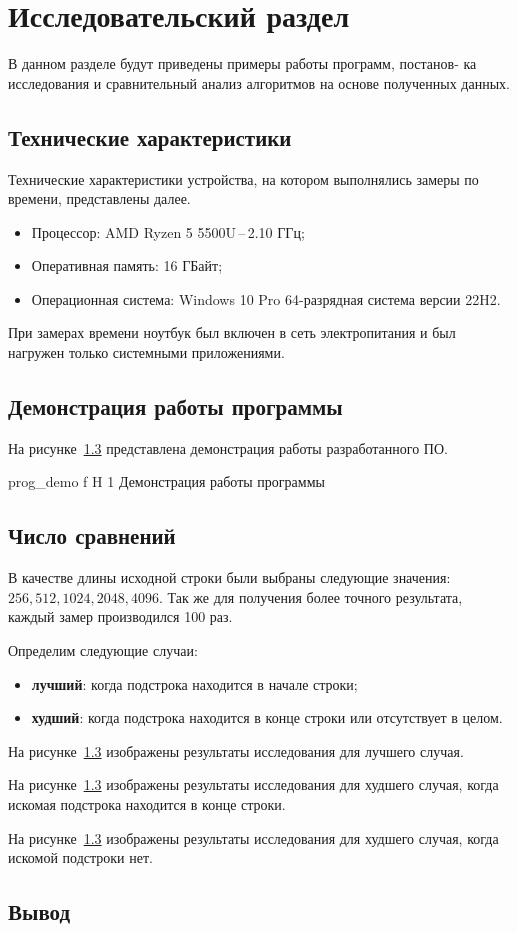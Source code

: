 \chapter{Исследовательский раздел}
В данном разделе будут приведены примеры работы программ, постанов-
ка исследования и сравнительный анализ алгоритмов на основе полученных
данных.

\section{Технические характеристики}
Технические характеристики устройства, на котором выполнялись замеры по времени, представлены далее.
\begin{itemize}
	\item Процессор: AMD Ryzen 5 5500U\,--\,2.10 ГГц;
	\item Оперативная память: 16 ГБайт;
	\item Операционная система: Windows 10 Pro 64-разрядная система версии 22H2.
\end{itemize}

При замерах времени ноутбук был включен в сеть электропитания и был нагружен только системными приложениями.

\section{Демонстрация работы программы}
На рисунке~\ref{} представлена демонстрация работы разработанного ПО.  

{prog_demo}
{f}
{H}
{1\textwidth}
{Демонстрация работы программы}

\section{Число сравнений}
В качестве длины исходной строки были выбраны следующие значения: $256, 512, 1024, 2048, 4096$. Так же для получения более точного результата, каждый замер производился 100 раз.

Определим следующие случаи:
\begin{itemize}
	\item \textbf{лучший}: когда подстрока находится в начале строки;
	\item \textbf{худший}: когда подстрока находится в конце строки или отсутствует в целом.
\end{itemize}

На рисунке~\ref{} изображены результаты исследования для лучшего случая.

На рисунке~\ref{} изображены результаты исследования для худшего случая, когда искомая подстрока находится в конце строки.

На рисунке~\ref{} изображены результаты исследования для худшего случая, когда искомой подстроки нет.

\section*{Вывод}